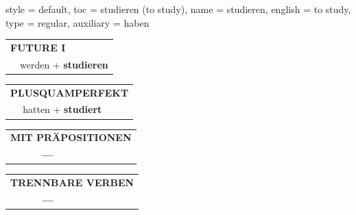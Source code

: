 \begin{verbentry}{
  style = {default},
  toc = {studieren (to study)},
  name = {studieren},
  english = {to study},
  type = {regular},
  auxiliary = {haben}
}
\begin{tabular}{rl}
    \multicolumn{2}{l}{\textbf{FUTURE I} }\\
   & werden + \textbf{studieren}\\
 
  \end{tabular}
\hfill
   \begin{tabular}{rl}
      \multicolumn{2}{l}{\textbf{PLUSQUAMPERFEKT}}\\
   & hatten + \textbf{studiert}\\
  \end{tabular}
  
  \vspace{10pt}

\begin{tabular}{lll}
\multicolumn{3}{l}{\textbf{MIT PRÄPOSITIONEN}}\\
& \textbf{---} & \\
\end{tabular}
\hfill
\begin{tabular}{lll}
\multicolumn{3}{l}{\textbf{TRENNBARE VERBEN}}\\
& \textbf{---} & \\
\end{tabular}

  \vspace{-5pt}
\end{verbentry}

